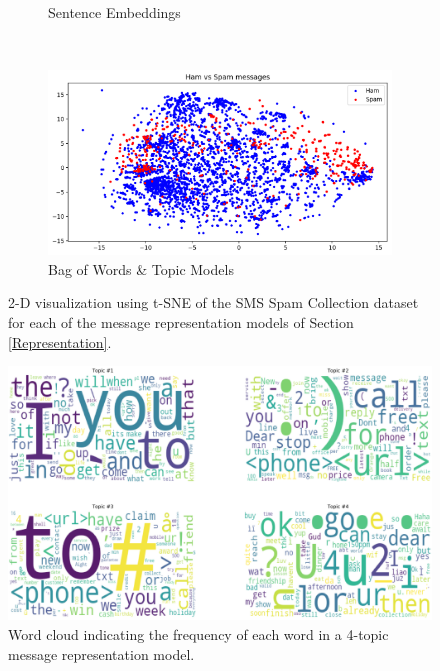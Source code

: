 \documentclass[letterpaper]{article}
\begin{document}
\begin{figure}[p]
\begin{subfigure}[t]{0.5\textwidth}
		\caption{Sentence Embeddings}
		\label{fig: sent_emb}
	\end{subfigure}
	~
	\begin{subfigure}[t]{0.5\textwidth}
		\centering
		\includegraphics[width = 0.95 \linewidth]{./plot_representations/bow-topics.png}
		\caption{Bag of Words \& Topic Models}
		\label{fig: bow-topics}
	\end{subfigure}
	\caption{2-D visualization using t-SNE of the SMS Spam Collection dataset for each of the message representation models of Section \ref{Representation}.}
	\label{fig: plot_representations}
\end{figure}

\begin{figure}[p]
	\centering
	\includegraphics[width = 0.95 \linewidth]{./topics_visualization/word_cloud.png}
	\caption{Word cloud indicating the frequency of each word in a 4-topic message representation model.}
	\label{fig: word_cloud}
\end{figure}
\end{document}
